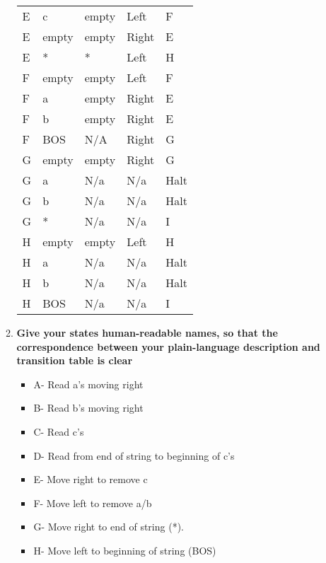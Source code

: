 \documentclass{article}
\begin{document}
\begin{enumerate}
\begin{enumerate}
\begin{tabular}{ l | l | l | l | l }
				E & c &empty& Left & F\\
				E &empty&empty& Right & E\\
				E & * & * & Left & H\\

				F &empty&empty& Left & F\\
				F & a &empty& Right & E\\
				F & b &empty& Right & E\\
				F & BOS & N/A & Right & G\\
				
				G &empty&empty&Right&G\\
				G & a & N/a&N/a&Halt\\
				G & b & N/a&N/a&Halt\\
				G & * & N/a&N/a&I\\

				H &empty&empty&Left& H \\
				H & a & N/a&N/a&Halt\\
				H & b & N/a&N/a&Halt\\
				H & BOS & N/a&N/a&I\\
      \end{tabular}
			\item \textbf{ Give your states human-readable names, so that the correspondence between your plain-language description and transition table is clear}\begin{itemize}
				\item A- Read a's moving right	
				\item B- Read b's moving right
				\item C- Read c's
				\item D- Read from end of string to beginning of c's
				\item E- Move right to remove c
				\item F- Move left to remove a/b
				\item G- Move right to end of string (*).
				\item H- Move left to beginning of string (BOS)
				\end{itemize}
			\end{enumerate}
	\end{enumerate}
\end{document}
